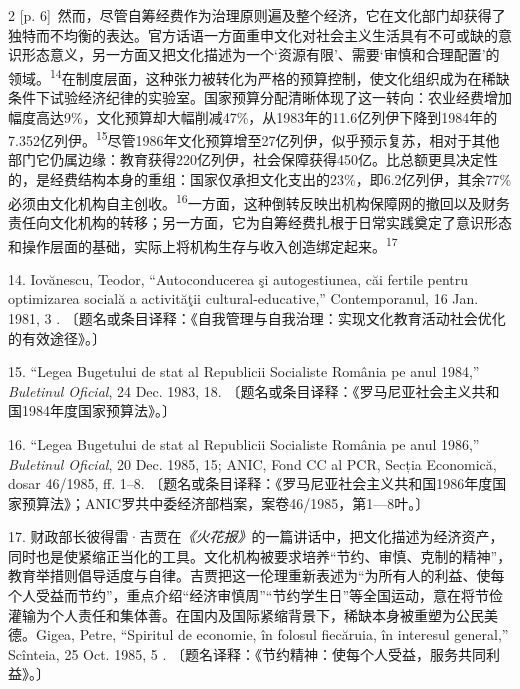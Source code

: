 \documentclass[10pt,a4paper]{article}
\begin{document}
\begin{paracol}{2}
{\scriptsize\color{gray} [p. 6]}\ 然而，尽管自筹经费作为治理原则遍及整个经济，它在文化部门却获得了独特而不均衡的表达。官方话语一方面重申文化对社会主义生活具有不可或缺的意识形态意义，另一方面又把文化描述为一个‘资源有限’、需要‘审慎和合理配置’的领\mbox{域。\textsuperscript{14}}在制度层面，这种张力被转化为严格的预算控制，使文化组织成为在稀缺条件下试验经济纪律的实验室。国家预算分配清晰体现了这一转向：农业经费增加幅度高达9\%，文化预算却大幅削减47\%，从1983年的11.6亿列伊下降到1984年的7.352亿列\mbox{伊。\textsuperscript{15}}尽管1986年文化预算增至27亿列伊，似乎预示复苏，相对于其他部门它仍属边缘：教育获得220亿列伊，社会保障获得450亿。比总额更具决定性的，是经费结构本身的重组：国家仅承担文化支出的23\%，即6.2亿列伊，其余77\%必须由文化机构自主创\mbox{收。\textsuperscript{16}}一方面，这种倒转反映出机构保障网的撤回以及财务责任向文化机构的转移；另一方面，它为自筹经费扎根于日常实践奠定了意识形态和操作层面的基础，实际上将机构生存与收入创造绑定起\mbox{来。\textsuperscript{17}}\par{\small 14. Iovănescu, Teodor, “Autoconducerea şi autogestiunea, căi fertile pentru optimizarea socială a activităţii cultural-educative,” Contemporanul, 16 Jan. 1981, 3 . 〔题名或条目译释：《自我管理与自我治理：实现文化教育活动社会优化的有效途径》。〕\par}{\small 15. “Legea Bugetului de stat al Republicii Socialiste România pe anul 1984,” \textit{Buletinul Oficial}, 24 Dec. 1983, 18. 〔题名或条目译释：《罗马尼亚社会主义共和国1984年度国家预算法》。〕\par}{\small 16. “Legea Bugetului de stat al Republicii Socialiste România pe anul 1986,” \textit{Buletinul Oficial}, 20 Dec. 1985, 15; ANIC, Fond CC al PCR, Secția Economică, dosar 46/1985, ff. 1–8. 〔题名或条目译释：《罗马尼亚社会主义共和国1986年度国家预算法》；ANIC罗共中委经济部档案，案卷46/1985，第1—8叶。〕\par}{\small 17. 财政部长彼得雷·吉贾在\textit{《火花报》}的一篇讲话中，把文化描述为经济资产，同时也是使紧缩正当化的工具。文化机构被要求培养“节约、审慎、克制的精神”，教育举措则倡导适度与自律。吉贾把这一伦理重新表述为“为所有人的利益、使每个人受益而节约”，重点介绍“经济审慎周”“节约学生日”等全国运动，意在将节俭灌输为个人责任和集体善。在国内及国际紧缩背景下，稀缺本身被重塑为公民美德。Gigea, Petre, “Spiritul de economie, în folosul fiecăruia, în interesul general,” Scînteia, 25 Oct. 1985, 5 . 〔题名译释：《节约精神：使每个人受益，服务共同利益》。〕\par}
\switchcolumn

\end{paracol}
\end{document}
